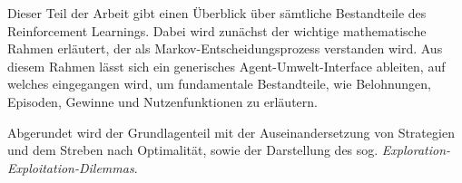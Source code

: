 Dieser Teil der Arbeit gibt einen Überblick über sämtliche Bestandteile des Reinforcement Learnings. Dabei wird zunächst der wichtige mathematische Rahmen erläutert, der als Markov-Entscheidungsprozess verstanden wird. Aus diesem Rahmen lässt sich ein generisches Agent-Umwelt-Interface ableiten, auf welches eingegangen wird, um fundamentale Bestandteile, wie Belohnungen, Episoden, Gewinne und Nutzenfunktionen zu erläutern. 
\par
Abgerundet wird der Grundlagenteil mit der Auseinandersetzung von Strategien und dem Streben nach Optimalität, sowie der Darstellung des sog. \textit{Exploration-Exploitation-Dilemmas}.